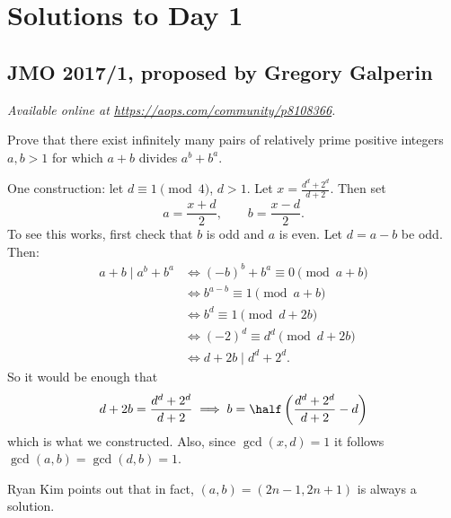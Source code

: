 \documentclass[11pt]{scrartcl}
\begin{document}
\section{Solutions to Day 1}
\subsection{JMO 2017/1, proposed by Gregory Galperin}
\textsl{Available online at \url{https://aops.com/community/p8108366}.}
\begin{mdframed}[style=mdpurplebox,frametitle={Problem statement}]
Prove that there exist infinitely many pairs of
relatively prime positive integers $a,b > 1$
for which $a+b$ divides $a^b+b^a$.
\end{mdframed}
One construction: let $d \equiv 1 \pmod 4$, $d > 1$.
Let $x = \frac{d^d+2^d}{d+2}$. Then set
\[ a = \frac{x+d}{2}, \qquad
  b = \frac{x-d}{2}. \]
To see this works, first check that $b$ is odd and $a$ is even.
Let $d = a-b$ be odd.
Then:
\begin{align*}
  a+b \mid a^b+b^a &\iff
  (-b)^b + b^a \equiv 0 \pmod{a+b} \\
  &\iff b^{a-b} \equiv 1 \pmod{a+b} \\
  &\iff b^d \equiv 1 \pmod{d+2b} \\
  &\iff (-2)^d \equiv d^d \pmod{d+2b} \\
  &\iff d+2b \mid d^d + 2^d.
\end{align*}
So it would be enough that
\[ d+2b = \frac{d^d+2^d}{d+2}
  \implies b = \half \left( \frac{d^d+2^d}{d+2} - d \right) \]
which is what we constructed.
Also, since $\gcd(x,d) = 1$ it follows $\gcd(a,b) = \gcd(d,b) = 1$.

\begin{remark*}
  Ryan Kim points out that in fact,
  $(a,b) = (2n-1,2n+1)$ is always a solution.
\end{remark*}
\pagebreak
\end{document}
